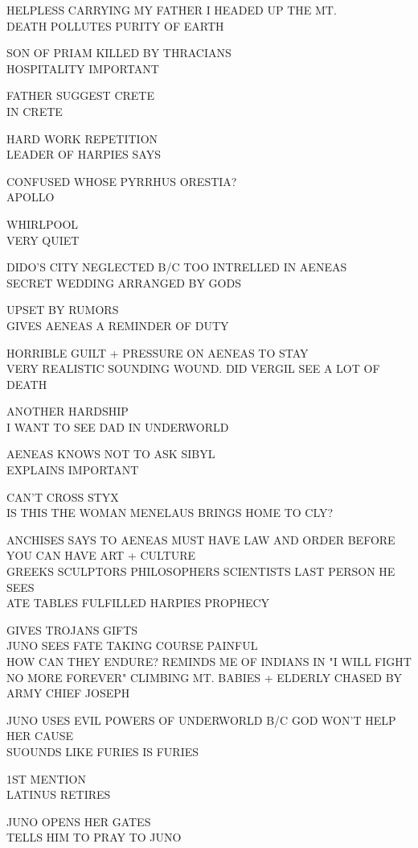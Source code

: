 \documentclass[10pt,letterpaper]{article}
\begin{document}
HELPLESS CARRYING MY FATHER I HEADED UP THE MT.\\
DEATH POLLUTES PURITY OF EARTH

SON OF PRIAM KILLED BY THRACIANS\\
HOSPITALITY IMPORTANT

FATHER SUGGEST CRETE\\
IN CRETE

HARD WORK REPETITION\\
LEADER OF HARPIES SAYS

CONFUSED WHOSE PYRRHUS ORESTIA?\\
APOLLO

WHIRLPOOL\\
VERY QUIET

DIDO'S CITY NEGLECTED B/C TOO INTRELLED IN AENEAS\\
SECRET WEDDING ARRANGED BY GODS

UPSET BY RUMORS\\
GIVES AENEAS A REMINDER OF DUTY

HORRIBLE GUILT + PRESSURE ON AENEAS TO STAY\\
VERY REALISTIC SOUNDING WOUND.  DID VERGIL SEE A LOT OF DEATH

ANOTHER HARDSHIP\\
I WANT TO SEE DAD IN UNDERWORLD

AENEAS KNOWS NOT TO ASK SIBYL\\
EXPLAINS IMPORTANT

CAN'T CROSS STYX\\
IS THIS THE WOMAN MENELAUS BRINGS HOME TO CLY?

ANCHISES SAYS TO AENEAS MUST HAVE LAW AND ORDER BEFORE YOU CAN HAVE ART + CULTURE\\
GREEKS SCULPTORS PHILOSOPHERS SCIENTISTS LAST PERSON HE SEES\\
ATE TABLES FULFILLED HARPIES PROPHECY

GIVES TROJANS GIFTS\\
JUNO SEES FATE TAKING COURSE PAINFUL\\
HOW CAN THEY ENDURE?  REMINDS ME OF INDIANS IN "I WILL FIGHT NO MORE FOREVER" CLIMBING MT. BABIES + ELDERLY CHASED BY ARMY CHIEF JOSEPH

JUNO USES EVIL POWERS OF UNDERWORLD B/C GOD WON'T HELP HER CAUSE\\
SUOUNDS LIKE FURIES IS FURIES

1ST MENTION\\
LATINUS RETIRES

JUNO OPENS HER GATES\\
TELLS HIM TO PRAY TO JUNO
\end{document}
